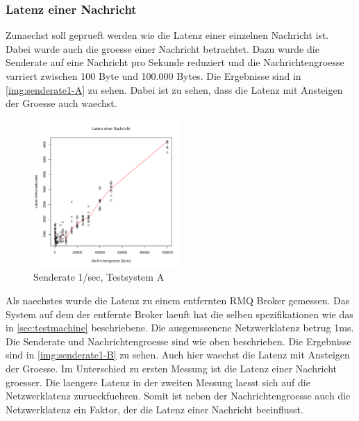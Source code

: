 \subsubsection{Latenz einer Nachricht}
\label{sec:oneMsgLatency}
Zunaechst soll geprueft werden wie die Latenz einer einzelnen Nachricht ist. Dabei wurde auch die groesse einer Nachricht betrachtet. Dazu wurde die Senderate auf eine Nachricht pro Sekunde reduziert und die Nachrichtengroesse varriert zwischen 100 Byte und 100.000 Bytes.
Die Ergebnisse sind in \autoref{img:senderate1-A} zu sehen. Dabei ist zu sehen, dass die Latenz mit Ansteigen der Groesse auch waechst. 
\begin{figure}
\center
  \includegraphics[width=0.5\textwidth]{images/measurement/rate-limit-1-A.pdf}
  \caption{Senderate 1/sec, Testsystem A}
  \label{img:senderate1-A}
\end{figure}
Als naechstes wurde die Latenz zu einem entfernten RMQ Broker gemessen. Das System auf dem der entfernte Broker laeuft hat die selben spezifikationen wie das in \autoref{sec:testmachine} beschriebene. Die ausgemssenene Netzwerklatenz betrug 1ms. Die Senderate und Nachrichtengroesse sind wie oben beschrieben. Die Ergebnisse sind in \autoref{img:senderate1-B} zu sehen. Auch hier waechst die Latenz mit Ansteigen der Groesse. Im Unterschied zu ersten Messung ist die Latenz einer Nachricht groesser. 
Die laengere Latenz in der zweiten Messung laesst sich auf die Netzwerklatenz zurueckfuehren. Somit ist neben der Nachrichtengroesse auch die Netzwerklatenz ein Faktor, der die Latenz einer Nachricht beeinflusst.

